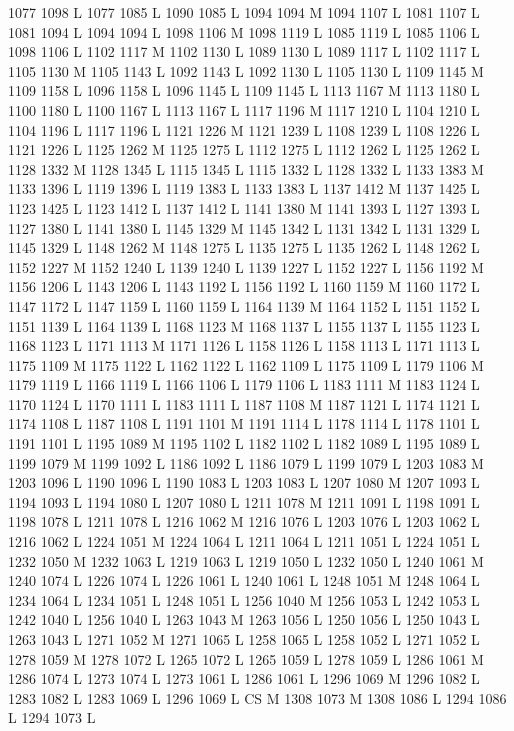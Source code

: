 {{{{{{{{{{{{{{{{{{{{{{{{{{{1077 1098 L
1077 1085 L
1090 1085 L
1094 1094 M 1094 1107 L
1081 1107 L
1081 1094 L
1094 1094 L
1098 1106 M 1098 1119 L
1085 1119 L
1085 1106 L
1098 1106 L
1102 1117 M 1102 1130 L
1089 1130 L
1089 1117 L
1102 1117 L
1105 1130 M 1105 1143 L
1092 1143 L
1092 1130 L
1105 1130 L
1109 1145 M 1109 1158 L
1096 1158 L
1096 1145 L
1109 1145 L
1113 1167 M 1113 1180 L
1100 1180 L
1100 1167 L
1113 1167 L
1117 1196 M 1117 1210 L
1104 1210 L
1104 1196 L
1117 1196 L
1121 1226 M 1121 1239 L
1108 1239 L
1108 1226 L
1121 1226 L
1125 1262 M 1125 1275 L
1112 1275 L
1112 1262 L
1125 1262 L
1128 1332 M 1128 1345 L
1115 1345 L
1115 1332 L
1128 1332 L
1133 1383 M 1133 1396 L
1119 1396 L
1119 1383 L
1133 1383 L
1137 1412 M 1137 1425 L
1123 1425 L
1123 1412 L
1137 1412 L
1141 1380 M 1141 1393 L
1127 1393 L
1127 1380 L
1141 1380 L
1145 1329 M 1145 1342 L
1131 1342 L
1131 1329 L
1145 1329 L
1148 1262 M 1148 1275 L
1135 1275 L
1135 1262 L
1148 1262 L
1152 1227 M 1152 1240 L
1139 1240 L
1139 1227 L
1152 1227 L
1156 1192 M 1156 1206 L
1143 1206 L
1143 1192 L
1156 1192 L
1160 1159 M 1160 1172 L
1147 1172 L
1147 1159 L
1160 1159 L
1164 1139 M 1164 1152 L
1151 1152 L
1151 1139 L
1164 1139 L
1168 1123 M 1168 1137 L
1155 1137 L
1155 1123 L
1168 1123 L
1171 1113 M 1171 1126 L
1158 1126 L
1158 1113 L
1171 1113 L
1175 1109 M 1175 1122 L
1162 1122 L
1162 1109 L
1175 1109 L
1179 1106 M 1179 1119 L
1166 1119 L
1166 1106 L
1179 1106 L
1183 1111 M 1183 1124 L
1170 1124 L
1170 1111 L
1183 1111 L
1187 1108 M 1187 1121 L
1174 1121 L
1174 1108 L
1187 1108 L
1191 1101 M 1191 1114 L
1178 1114 L
1178 1101 L
1191 1101 L
1195 1089 M 1195 1102 L
1182 1102 L
1182 1089 L
1195 1089 L
1199 1079 M 1199 1092 L
1186 1092 L
1186 1079 L
1199 1079 L
1203 1083 M 1203 1096 L
1190 1096 L
1190 1083 L
1203 1083 L
1207 1080 M 1207 1093 L
1194 1093 L
1194 1080 L
1207 1080 L
1211 1078 M 1211 1091 L
1198 1091 L
1198 1078 L
1211 1078 L
1216 1062 M 1216 1076 L
1203 1076 L
1203 1062 L
1216 1062 L
1224 1051 M 1224 1064 L
1211 1064 L
1211 1051 L
1224 1051 L
1232 1050 M 1232 1063 L
1219 1063 L
1219 1050 L
1232 1050 L
1240 1061 M 1240 1074 L
1226 1074 L
1226 1061 L
1240 1061 L
1248 1051 M 1248 1064 L
1234 1064 L
1234 1051 L
1248 1051 L
1256 1040 M 1256 1053 L
1242 1053 L
1242 1040 L
1256 1040 L
1263 1043 M 1263 1056 L
1250 1056 L
1250 1043 L
1263 1043 L
1271 1052 M 1271 1065 L
1258 1065 L
1258 1052 L
1271 1052 L
1278 1059 M 1278 1072 L
1265 1072 L
1265 1059 L
1278 1059 L
1286 1061 M 1286 1074 L
1273 1074 L
1273 1061 L
1286 1061 L
1296 1069 M 1296 1082 L
1283 1082 L
1283 1069 L
1296 1069 L
CS M
1308 1073 M 1308 1086 L
1294 1086 L
1294 1073 L
}}}}}}}}}}}}}}}}}}}}}}}}}}}
